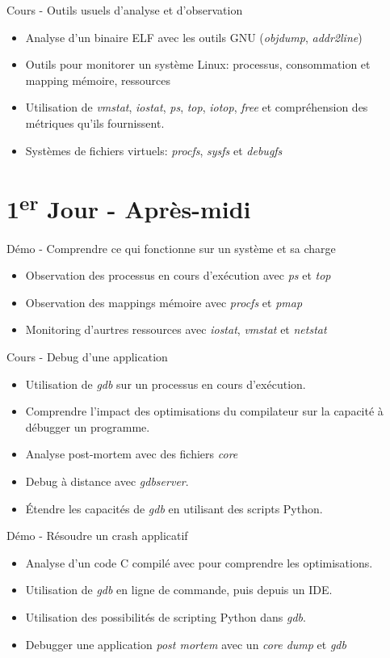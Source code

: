 \documentclass[a4paper,12pt,obeyspaces,spaces,hyphens]{article}
\begin{document}
\feagendaonecolumn
{Cours - Outils usuels d'analyse et d'observation}
{
  \begin{itemize}
  \item Analyse d'un binaire ELF avec les outils GNU ({\em objdump},
    {\em addr2line})
  \item Outils pour monitorer un système Linux: processus,
    consommation et mapping mémoire, ressources
  \item Utilisation de {\em vmstat}, {\em iostat}, {\em ps}, {\em
      top}, {\em iotop}, {\em free} et compréhension des métriques
    qu'ils fournissent.
  \item Systèmes de fichiers virtuels: {\em procfs}, {\em sysfs} et
    {\em debugfs}
  \end{itemize}
}

\section{1\textsuperscript{er} Jour - Après-midi}

\feagendaonecolumn
{Démo - Comprendre ce qui fonctionne sur un système et sa charge}
{
  \begin{itemize}
  \item Observation des processus en cours d'exécution avec {\em ps} et {\em top}
  \item Observation des mappings mémoire avec {\em procfs} et {\em pmap}
  \item Monitoring d'aurtres ressources avec {\em iostat}, {\em
      vmstat} et {\em netstat}
 \end{itemize}
}

\feagendatwocolumn
{Cours - Debug d'une application}
{
  \begin{itemize}
  \item Utilisation de {\em gdb} sur un processus en cours d'exécution.
  \item Comprendre l'impact des optimisations du compilateur sur la
    capacité à débugger un programme.
  \item Analyse post-mortem avec des fichiers {\em core}
  \item Debug à distance avec {\em gdbserver}.
  \item Étendre les capacités de {\em gdb} en utilisant des scripts
    Python.
  \end{itemize}
}
{Démo - Résoudre un crash applicatif}
{
  \begin{itemize}
  \item Analyse d'un code C compilé avec  pour
    comprendre les optimisations.
  \item Utilisation de {\em gdb} en ligne de commande, puis depuis un
    IDE.
  \item Utilisation des possibilités de scripting Python dans {\em gdb}.
  \item Debugger une application {\em post mortem} avec un {\em core
      dump} et {\em gdb}
  \end{itemize}
}
\end{document}
